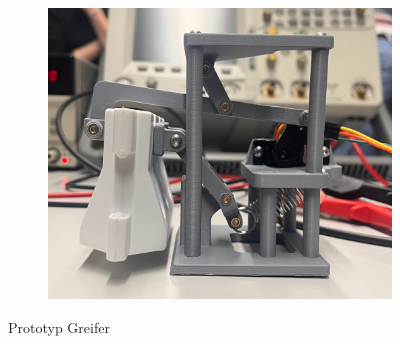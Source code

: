 \begin{figure}[H]
\begin{subfigure}{0.33\textwidth}
\includegraphics[width=0.95\linewidth]{assets/greifer-prototyp/Bild_greifer_2_anheben.jpeg} 
\end{subfigure}
\caption{Prototyp Greifer}
\label{fig:prototype-greifer}
\end{figure}